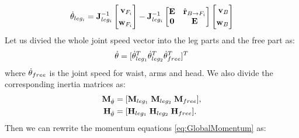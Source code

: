 \begin{equation}
\dot{\bf \theta}_{leg_i} = {\bf J}^{-1}_{leg_i}
\left[
\begin{aligned}
{\bf v}_{F_i} \\
{\bf w}_{F_i} \\
\end{aligned}
\right]
- 
{\bf J}^{-1}_{leg_i}
\left[
\begin{matrix}
{\bf E} & \hat{\bf r}_{B \rightarrow F_i} \\
{\bf 0} & {\bf E}\\
\end{matrix}
\right]
\left[
\begin{aligned}
{\bf v}_{B} \\
{\bf w}_{B} \\
\end{aligned}
\right]
\label{eq:ThetaLeg}
\end{equation}
Let us divied the whole joint speed vector into the leg parts and the free part as:
\begin{equation}
\dot{\bf \theta} = [ \dot{\bf \theta}^T_{leg_1} \dot{\bf \theta}^T_{leg_2} 
  \dot{\bf \theta}^T_{free} ]^T
\end{equation}
where $\dot{\bf \theta}_{free}$ is the joint speed for waist, arms and head.
We also divide the corresponding inertia matrices as:
\begin{equation}
\begin{aligned}
{\bf M}_{\dot{\theta}} &= [ {\bf M}_{leg_1} \; {\bf M}_{leg_2} \; {\bf M}_{free} ], \\
{\bf H}_{\dot{\theta}} &= [ {\bf H}_{leg_1} \; {\bf H}_{leg_2} \; {\bf H}_{free} ]. \\
\end{aligned}
\end{equation}
Then we can rewrite the momentum equations \ref{eq:GlobalMomentum} as:
